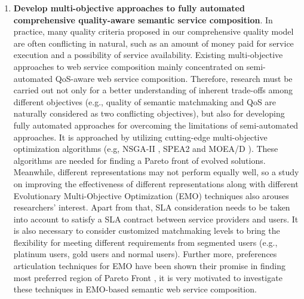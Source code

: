 \begin{enumerate}
 \item \label{Obj:2} \textbf{Develop multi-objective approaches to fully automated comprehensive quality-aware semantic service composition}. In practice, many quality criteria proposed in our comprehensive quality model are often conflicting in natural, such as an amount of money paid for service execution and a possibility of service availability. Existing multi-objective approaches \cite{chen2014partial,xiang2014qos,yin2014hybrid,liu2005dynamic,yu2013efficient,zhang2010qos} to web service composition mainly concentrated on semi-automated QoS-aware web service composition. Therefore, research must be carried out not only for a better understanding of inherent trade-offs among different objectives (e.g., quality of semantic matchmaking and QoS are naturally considered as two conflicting objectives), but also for developing fully automated approaches for overcoming the limitations of semi-automated approaches. It is approached by utilizing cutting-edge multi-objective optimization algorithms (e.g, NSGA-II \cite{deb2002fast}, SPEA2 \cite{zitzler2001spea2} and MOEA/D \cite{zhang2007moea}). These algorithms are needed for finding a Pareto front of evolved solutions. Meanwhile, different representations may not perform equally well, so a study on improving the effectiveness of different representations along with different Evolutionary Multi-Objective Optimization (EMO) techniques also arouses researchers' interest. Apart from that, SLA consideration needs to be taken into account to satisfy a SLA contract between service providers and users. It is also necessary to consider customized matchmaking levels to bring the flexibility for meeting different requirements from segmented users (e.g., platinum users, gold users and normal users). Further more, preferences articulation techniques for EMO have been shown their promise in finding most preferred region of Pareto Front \cite{branke2016using,branke2005integrating,branke2001guidance,cheng2015reference,giagkiozis2014pareto}, it is very motivated to investigate these techniques in EMO-based semantic web service composition.
 
   \begin{enumerate}
   

\end{enumerate}
\end{enumerate}
